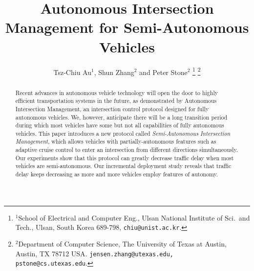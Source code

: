 \documentclass[letterpaper, 10pt, conference]{ieeeconf}
\begin{document}


\title{\LARGE \bf
Autonomous Intersection Management for Semi-Autonomous Vehicles
}

\author{Tsz-Chiu Au$^{1}$, Shun Zhang$^{2}$ and Peter Stone$^{2}$%
\thanks{$^{1}$School of Electrical and Computer Eng.,
       Ulsan National Institute of Sci.\ and Tech.,
       Ulsan, South Korea 689-798,
       {\tt\small chiu@unist.ac.kr}.}%
\thanks{$^{2}$Department of Computer Science,
       The University of Texas at Austin,
       Austin, TX 78712 USA.
       {\tt\small jensen.zhang@utexas.edu, pstone@cs.utexas.edu}.}}


\maketitle

\thispagestyle{empty}
\pagestyle{empty}



\begin{abstract}
Recent advances in autonomous vehicle technology will open the door to
highly efficient transportation systems in the future, as demonstrated
by Autonomous Intersection Management, an intersection control
protocol designed for fully autonomous vehicles.  We, however,
anticipate there will be a long transition period during which most
vehicles have some but not all capabilities of fully autonomous
vehicles. This paper introduces a new protocol called
\emph{Semi-Autonomous Intersection Management}, which allows vehicles
with partially-autonomous features such as adaptive cruise control to
enter an intersection from different directions simultaneously.  Our
experiments show that this protocol can greatly decrease traffic delay
when most vehicles are semi-autonomous.  Our incremental deployment
study reveals that traffic delay keeps decreasing as 
more and more vehicles employ features of autonomy.
\end{abstract}



\end{document}
